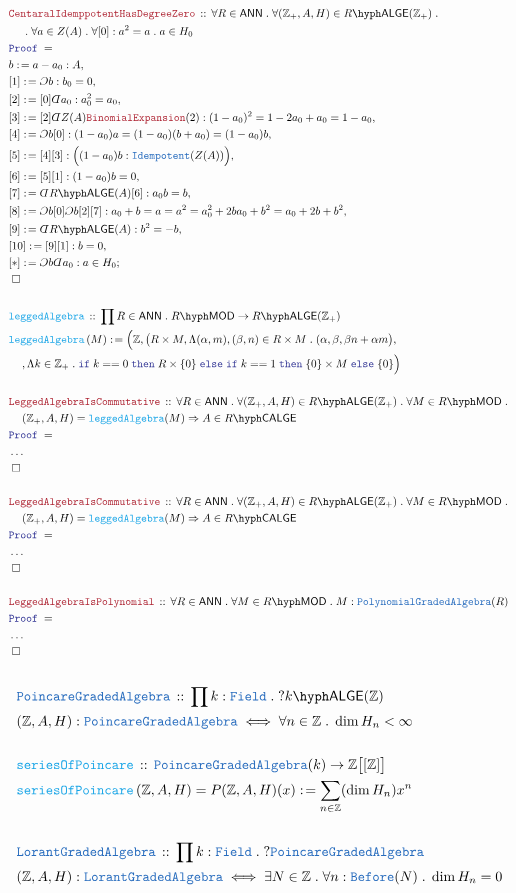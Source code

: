 \documentclass[12pt]{scrartcl}%
\newcommand{\TYPE}[1]{\textcolor{NavyBlue}{\mathtt{#1}}}%
\newcommand{\FUNC}[1]{\textcolor{Cerulean}{\mathtt{#1}}}%
\newcommand{\LOGIC}[1]{\textcolor{Blue}{\mathtt{#1}}}%
\newcommand{\THM}[1]{\textcolor{Maroon}{\mathtt{#1}}}%
\renewcommand{\.}{\; . \;} %
\newcommand{\de}{: \kern 0.1pc =} %
\newcommand{\If}{\LOGIC{if} \;} %
\newcommand{\Then}{ \; \LOGIC{then} \;} %
\newcommand{\Else}{\; \LOGIC{else} \;} %
\newcommand{\Act}[1]{\left( #1 \right)} %
\newcommand{\Theorem}[2]{& \THM{#1} \, :: \, #2 \\ & \Proof = \\ } %
\newcommand{\DeclareType}[2]{& \TYPE{#1} \, :: \, #2 \\}%
\newcommand{\DefineType}[3]{& #1 : \TYPE{#2} \iff #3 \\}%
\newcommand{\DeclareFunc}[2]{& \FUNC{#1} \, :: \, #2 \\}%
\newcommand{\DefineFunc}[3]{&  \FUNC{#1}\Act{#2} \de #3 \\}%
\newcommand{\DefineNamedFunc}[4]{&  \FUNC{#1}\Act{#2} = #3 \de #4 \\}%
\newcommand{\NewLine}{\\ & \kern 1pc}%
\newcommand{\Page}[1]{ \begin{align*} #1 \end{align*}  }%
\newcommand{ \bd }{ \ByDef }%
\newcommand{\NoProof}{ & \ldots \\ \EndProof}%
\newcommand{\Int}{\mathbb{Z}}%
\newcommand{\Say}[3]{& #1 \de #2 : #3, \\} %
\newcommand{\Conclude}[3]{& #1 \de #2 : #3; \\}%
\newcommand{\QED}{\; \square} %
\newcommand{\EndProof}{& \QED \\} %
\newcommand{\ByDef}{\rotatebox[origin=c]{-180}{$D$}}%
\newcommand{\ByConstr}{\rotatebox[origin=c]{-180}{$C$}}%
\newcommand{\Proof}{\LOGIC{Proof} \; } %
\newcommand{\LMOD}[1]{#1\hyph\mathsf{MOD}} %
\newcommand{\Field}{\TYPE{Field}}
\newcommand{\ANN}{\mathsf{ANN}} %
\newcommand{\LALGE}[1]{#1\hyph\mathsf{ALGE}}%
\newcommand{\LCALGE}[1]{#1\hyph\mathsf{CALGE}}%
\newcommand{\PGA}{\TYPE{PolynomialGradedAlgebra}}
\begin{document}
\Page{
	\Theorem{CentaralIdemppotentHasDegreeZero}
	{
		\forall R \in \ANN \.
		\forall (\Int_+,A,H) \in \LALGE{R}(\Int_+) \. \NewLine \.  
		\forall a \in Z(A) \.
		\forall [0] : a^2 = a \.
		a \in H_0
	}
	\Say{b}{a - a_0}{A}
	\Say{[1]}{\ByConstr b}{b_0 = 0}
	\Say{[2]}{[0]\bd a_0}{a_0^2 = a_0}
	\Say{[3]}{[2]\bd Z(A) \THM{BinomialExpansion}(2)}{ (1 - a_0)^2 = 1 - 2a_0 + a_0 = 1 - a_0  }
	\Say{[4]}{ \ByConstr b [0]  }{ (1 - a_0)a = (1 - a_0)(b + a_0) = (1 - a_0)b }
	\Say{[5]}{[4][3]}{\Big( (1 - a_0)b : \TYPE{Idempotent}(Z(A)) \Big)}
	\Say{[6]}{[5][1]}{(1 -a_0)b = 0}
	\Say{[7]}{\bd \LALGE{R}(A)[6]}{a_0b = b}
	\Say{[8]}{\ByConstr b [0] \ByConstr b [2][7]}{  a_0 + b  = a = a^2  = a_0^2 + 2ba_0 + b^2 = a_0 + 2b + b^2  }
	\Say{[9]}{\bd \LALGE{R}(A)}{b^2 = -b}
	\Say{[10]}{[9][1]}{b = 0 }
	\Conclude{[*]}{\ByConstr b \bd a_0}{a \in H_0}
	\EndProof
	\\
	\DeclareFunc{leggedAlgebra}{\prod R \in \ANN \. \LMOD{R}  \to  \LALGE{R}(\Int_+) }
	\DefineFunc{leggedAlgebra}{ M }{
		\Big( \Int,\big(R \times M, \Lambda (\alpha,m),(\beta,n) \in R \times M \. (\alpha, \beta, \beta n + \alpha m\big), 
		\NewLine,
		\Lambda k \in \Int_+ \. \If k == 0 \Then R \times \{0\} \Else \If k == 1 \Then \{0\} \times M  \Else  \{0\}   \Big)
	}
	\\
	\Theorem{LeggedAlgebraIsCommutative}{ \forall R \in \ANN \. \forall (\Int_+,A,H) \in \LALGE{R}(\Int_+) \. \forall M \in \LMOD{R} \. 
		\NewLine  (\Int_+,A,H) = \FUNC{leggedAlgebra}(M) \Rightarrow A \in \LCALGE{R} 
	}
	\NoProof
	\\
	\Theorem{LeggedAlgebraIsCommutative}{ \forall R \in \ANN \. \forall (\Int_+,A,H) \in \LALGE{R}(\Int_+) \. \forall M \in \LMOD{R} \. 
		\NewLine  (\Int_+,A,H) = \FUNC{leggedAlgebra}(M) \Rightarrow A \in \LCALGE{R} 
	}
	\NoProof
	\\
	\Theorem{LeggedAlgebraIsPolynomial}{ \forall R \in \ANN \.  \forall M \in \LMOD{R} \.  M : \PGA(R)
	}
	\NoProof
	\\
}\Page{
	\DeclareType{PoincareGradedAlgebra}{ \prod k : \Field \. ? \LALGE{k}(\Int)}
	\DefineType{(\Int,A,H)}{PoincareGradedAlgebra}{\forall n \in \Int \. \dim H_n < \infty }
	\\
	\DeclareFunc{seriesOfPoincare}{\TYPE{PoincareGradedAlgebra}(k) \to \Int\big[[\Int]\big]}
	\DefineNamedFunc{seriesOfPoincare}{\Int,A,H}{P(\Int,A,H)(x)}{ \sum_{n \in \Int} (\dim H_n) x^n}
	\\
	\DeclareType{LorantGradedAlgebra}{ \prod k : \Field \. ? \TYPE{PoincareGradedAlgebra}}
	\DefineType{(\Int,A,H)}{LorantGradedAlgebra}{\exists N \in \Int \. \forall n : \TYPE{Before}(N) \. \dim H_n = 0 }
}
\end{document}
